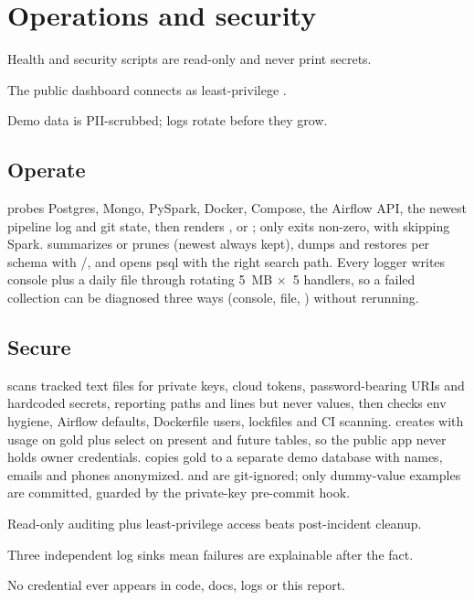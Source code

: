 \chapter{Operations and security}

\begin{glance}
\item Health and security scripts are read-only and never print secrets.
\item The public dashboard connects as least-privilege .
\item Demo data is PII-scrubbed; logs rotate before they grow.
\end{glance}

\section{Operate}

 probes Postgres, Mongo, PySpark, Docker, Compose, the Airflow API, the newest pipeline log and git state, then renders ,  or ; only  exits non-zero, with  skipping Spark.  summarizes or prunes  (newest always kept),  dumps and restores per schema with /, and  opens psql with the right search path. Every logger writes console plus a daily file through rotating 5~MB $\times$~5 handlers, so a failed collection can be diagnosed three ways (console, file, ) without rerunning.

\section{Secure}

 scans tracked text files for private keys, cloud tokens, password-bearing URIs and hardcoded secrets, reporting paths and lines but never values, then checks env hygiene, Airflow defaults, Dockerfile users, lockfiles and CI scanning.  creates  with usage on gold plus select on present and future tables, so the public app never holds owner credentials.  copies gold to a separate demo database with names, emails and phones anonymized.  and  are git-ignored; only dummy-value examples are committed, guarded by the private-key pre-commit hook.

\begin{keybox}
\item Read-only auditing plus least-privilege access beats post-incident cleanup.
\item Three independent log sinks mean failures are explainable after the fact.
\item No credential ever appears in code, docs, logs or this report.
\end{keybox}
